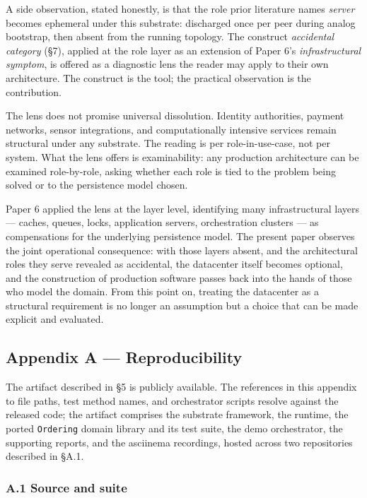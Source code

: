 \documentclass[
]{article}
\begin{document}
A side observation, stated honestly, is that the role prior literature
names \emph{server} becomes ephemeral under this substrate: discharged
once per peer during analog bootstrap, then absent from the running
topology. The construct \emph{accidental category} (§7), applied at the
role layer as an extension of Paper 6's \emph{infrastructural symptom},
is offered as a diagnostic lens the reader may apply to their own
architecture. The construct is the tool; the practical observation is
the contribution.

The lens does not promise universal dissolution. Identity authorities,
payment networks, sensor integrations, and computationally intensive
services remain structural under any substrate. The reading is per
role-in-use-case, not per system. What the lens offers is examinability:
any production architecture can be examined role-by-role, asking whether
each role is tied to the problem being solved or to the persistence
model chosen.

Paper 6 applied the lens at the layer level, identifying many
infrastructural layers --- caches, queues, locks, application servers,
orchestration clusters --- as compensations for the underlying
persistence model. The present paper observes the joint operational
consequence: with those layers absent, and the architectural roles they
serve revealed as accidental, the datacenter itself becomes optional,
and the construction of production software passes back into the hands
of those who model the domain. From this point on, treating the
datacenter as a structural requirement is no longer an assumption but a
choice that can be made explicit and evaluated.

\subsection{Appendix A ---
Reproducibility}\label{appendix-a-reproducibility}

The artifact described in §5 is publicly available. The references in
this appendix to file paths, test method names, and orchestrator scripts
resolve against the released code; the artifact comprises the substrate
framework, the runtime, the ported \texttt{Ordering} domain library and
its test suite, the demo orchestrator, the supporting reports, and the
asciinema recordings, hosted across two repositories described in §A.1.

\subsubsection{A.1 Source and suite}\label{a.1-source-and-suite}
\end{document}
